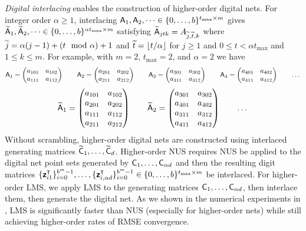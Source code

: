 \documentclass[acmsmall]{acmart}
\begin{document}
\emph{Digital interlacing} enables the construction of higher-order digital nets. For integer order $\alpha \geq 1$, interlacing $\mA_1,\mA_2,\dots \in \{0,\dots,b\}^{t_\mathrm{max} \times m}$ gives $\tmA_1,\tmA_2,\dots \in \{0,\dots,b\}^{\alpha t_\mathrm{max} \times m}$ satisfying $\tmA_{jtk} = A_{\tj,\tt,k}$ where $\tj = \alpha (j-1) + (t \mod \alpha) + 1$ and $\tt = \lfloor t / \alpha \rfloor$ for $j \geq 1$ and $0 \leq t < \alpha t_\mathrm{max}$ and $1 \leq k \leq m$. For example, with $m=2$, $t_\mathrm{max}=2$, and $\alpha=2$ we have
$$\mA_1 = \begin{pmatrix} a_{101} & a_{102} \\ a_{111} & a_{112} \end{pmatrix} \qquad \mA_2 = \begin{pmatrix} a_{201} & a_{202} \\ a_{211} & a_{212} \end{pmatrix} \qquad \mA_3 = \begin{pmatrix} a_{301} & a_{302} \\ a_{311} & a_{312} \end{pmatrix} \qquad \mA_4 = \begin{pmatrix} a_{401} & a_{402} \\ a_{411} & a_{412} \end{pmatrix} \qquad \dots$$
$$\tmA_1 = \begin{pmatrix} a_{101} & a_{102} \\ a_{201} & a_{202} \\ a_{111} & a_{112} \\ a_{211} & a_{212} \end{pmatrix} \qquad \tmA_2 = \begin{pmatrix} a_{301} & a_{302} \\ a_{401} & a_{402} \\ a_{311} & a_{312} \\ a_{411} & a_{412}\end{pmatrix} \qquad \dots$$
Without scrambling, higher-order digital nets are constructed using interlaced generating matrices $\tmC_1,\dots,\tmC_d$. Higher-order NUS \citep{dick.higher_order_scrambled_digital_nets} requires NUS be applied to the digital net point sets generated by $\mC_1,\dots,\mC_{\alpha d}$ and then the resulting digit matrices $\{\bmz_{i1}^\intercal\}_{i=0}^{b^m-1},\dots,\{\bmz_{i,\alpha d}^\intercal\}_{i=0}^{b^m-1} \in \{0,\dots,b\}^{t_\mathrm{max} \times m}$ be interlaced. For higher-order LMS, we apply LMS to the generating matrices $\mC_1,\dots,\mC_{\alpha d}$, then interlace them, then generate the digital net. As we shown in the numerical experiments in , LMS is significantly faster than NUS (especially for higher-order nets) while still achieving higher-order rates of RMSE convergence. 
\end{document}
